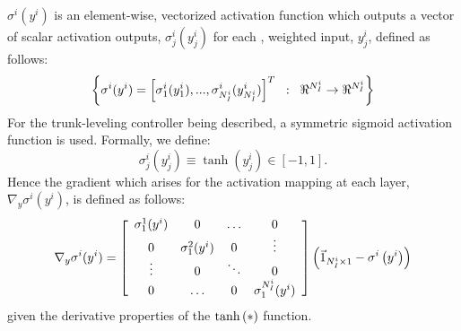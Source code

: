 		$\sigma^{i}(y^{i})$ is an element-wise, vectorized activation function which outputs a vector of scalar activation outputs, $\sigma_{j}^{i}(y_{j}^{i}) $ for each \Jth, weighted input, $y_{j}^{i}$, defined as follows:
		\begin{equation*}
			\left\{ \sigma^{i}(y^{i}) = \left[ \sigma_{1}^{i}(y_{1}^{i}),...,\sigma_{N_{I}^{i}}^{i}(y_{N_{I}^{i}}^{i}) \right]^{T} \hspace{2mm} : \hspace{2mm} \Re^{N_{I}^{i}} \rightarrow \Re^{N_{I}^{i}}\right\}
		\end{equation*}
		For the trunk-leveling controller being described, a symmetric sigmoid activation function is used. Formally, we define:
			\begin{equation}
				\sigma_{j}^{i}(y_{j}^{i}) \equiv \tanh(y_{j}^{i}) \in [-1,1]. 
				\label{eq::activation_function}
			\end{equation}
		Hence the gradient which arises for the activation mapping at each layer, $\nabla_{y} \sigma^{i}(y^{i})$, is defined as follows: 
		\newcommand{\acti}[1]{\sigma^{#1}_{1}(y^{i})}
		\begin{equation}
			\nabla_{y} \sigma^{i}(y^{i})  =
			\left[
			\begin{array}{cccc}
				\acti{1}	&	0		&	\ldots 		&	0 			\\	
				0			&	\acti{2}&	0			& 	\vdots 		\\
				\vdots 		&	0		& 	\ddots 		& 	0			\\
					0			&	\ldots	&	0			& 	\acti{N_{I}^{i}}
			\end{array}
			\right]
			\wrap{\vec{1}_{N_{I}^{i}\times1} - \sigma^{i}\wrap{y^{i} } }
			\label{eq::bp_sigmoid_deriv}
		\end{equation} 
		given the derivative properties of the $\tanh\left(*\right)$ function.
		
